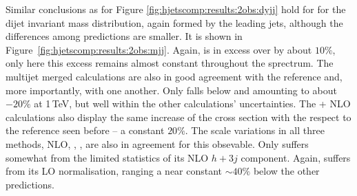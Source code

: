 Similar conclusions as for Figure \ref{fig:hjetscomp:results:2obs:dyjj} 
hold for for the dijet invariant mass distribution, again formed by the 
leading jets, although the differences among predictions are smaller. 
It is shown in Figure~\ref{fig:hjetscomp:results:2obs:mjj}. Again, \Sherpa 
\NNLOPS is in excess over \Powheg \NNLOPS by about $10\%$, only here this 
excess remains almost constant throughout the sprectrum. The multijet 
merged calculations are also in good agreement with the \Powheg reference 
and, more importantly, with one another. Only \MGaMC falls below 
\Herwig and \Sherpa \MEPSatNLO amounting to about $-20\%$ at 1\,TeV, 
but well within the other calculations' uncertainties. The \GoSam{}+\Sherpa 
NLO calculations also display the same increase of the cross section with 
the respect to the reference seen before -- a constant $20\%$. The 
scale variations in all three methods, NLO, \Minlo, \Loopsim, are 
also in agreement for this obsevable. Only \Loopsim suffers somewhat 
from the limited statistics of its NLO $h+3j$ component. Again, \Hej 
suffers from its LO normalisation, ranging a near constant $\sim 40\%$ 
below the other predictions.


